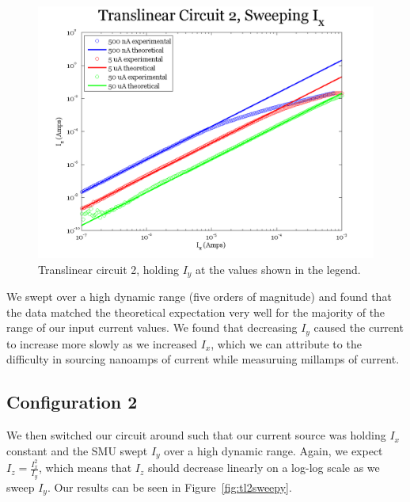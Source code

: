\documentclass{article}
\begin{document}
\begin{figure}[H]
\begin{center}
\includegraphics[scale=.75]{exp3_sweepx.png}
\caption{Translinear circuit 2, holding $I_y$ at the values shown in the legend.}
\label{fig:tl2sweepx}
\end{center}
\end{figure}

We swept over a high dynamic range (five orders of magnitude) and found that the data matched the theoretical expectation very well for the majority of the range of our input current values.  We found that decreasing $I_y$ caused the current to increase more slowly as we increased $I_x$, which we can attribute to the difficulty in sourcing nanoamps of current while measuruing millamps of current.

\subsection*{Configuration 2}

We then switched our circuit around such that our current source was holding $I_x$ constant and the SMU swept $I_y$ over a high dynamic range.  Again, we expect $I_z = \frac{I_x^2}{I_y}$, which means that $I_z$ should decrease linearly on a log-log scale as we sweep $I_y$.  Our results can be seen in Figure~\ref{fig:tl2sweepy}.
\end{document}
